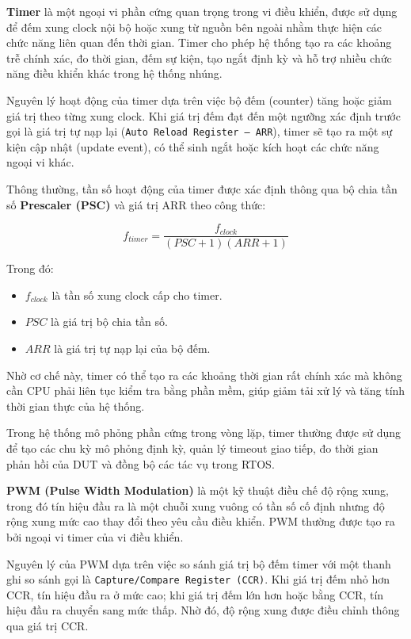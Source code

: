 \textbf{Timer} là một ngoại vi phần cứng quan trọng trong vi điều khiển, được sử dụng để đếm xung clock nội bộ hoặc xung từ nguồn bên ngoài nhằm thực hiện các chức năng liên quan đến thời gian. Timer cho phép hệ thống tạo ra các khoảng trễ chính xác, đo thời gian, đếm sự kiện, tạo ngắt định kỳ và hỗ trợ nhiều chức năng điều khiển khác trong hệ thống nhúng.

Nguyên lý hoạt động của timer dựa trên việc bộ đếm (counter) tăng hoặc giảm giá trị theo từng xung clock. Khi giá trị đếm đạt đến một ngưỡng xác định trước gọi là giá trị tự nạp lại (\texttt{Auto Reload Register – ARR}), timer sẽ tạo ra một sự kiện cập nhật (update event), có thể sinh ngắt hoặc kích hoạt các chức năng ngoại vi khác.

Thông thường, tần số hoạt động của timer được xác định thông qua bộ chia tần số \textbf{Prescaler (PSC)} và giá trị ARR theo công thức:

\begin{equation}
f_{timer} = \frac{f_{clock}}{(PSC + 1)(ARR + 1)}
\end{equation}

Trong đó:
\begin{itemize}
    \item $f_{clock}$ là tần số xung clock cấp cho timer.
    \item $PSC$ là giá trị bộ chia tần số.
    \item $ARR$ là giá trị tự nạp lại của bộ đếm.
\end{itemize}

Nhờ cơ chế này, timer có thể tạo ra các khoảng thời gian rất chính xác mà không cần CPU phải liên tục kiểm tra bằng phần mềm, giúp giảm tải xử lý và tăng tính thời gian thực của hệ thống.

Trong hệ thống mô phỏng phần cứng trong vòng lặp, timer thường được sử dụng để tạo các chu kỳ mô phỏng định kỳ, quản lý timeout giao tiếp, đo thời gian phản hồi của DUT và đồng bộ các tác vụ trong RTOS.

\textbf{PWM (Pulse Width Modulation)} là một kỹ thuật điều chế độ rộng xung, trong đó tín hiệu đầu ra là một chuỗi xung vuông có tần số cố định nhưng độ rộng xung mức cao thay đổi theo yêu cầu điều khiển. PWM thường được tạo ra bởi ngoại vi timer của vi điều khiển.

Nguyên lý của PWM dựa trên việc so sánh giá trị bộ đếm timer với một thanh ghi so sánh gọi là \texttt{Capture/Compare Register (CCR)}. Khi giá trị đếm nhỏ hơn CCR, tín hiệu đầu ra ở mức cao; khi giá trị đếm lớn hơn hoặc bằng CCR, tín hiệu đầu ra chuyển sang mức thấp. Nhờ đó, độ rộng xung được điều chỉnh thông qua giá trị CCR.

